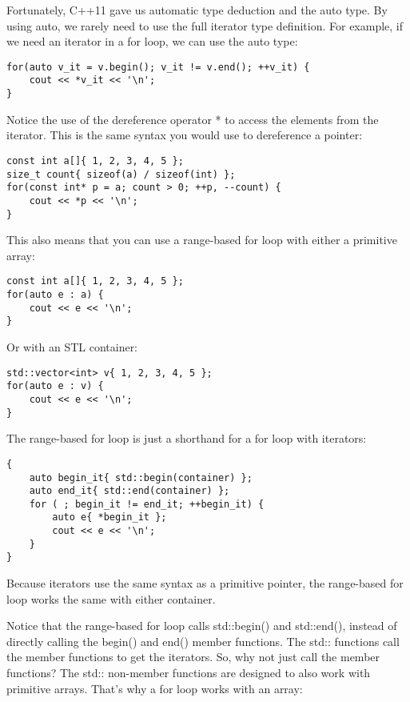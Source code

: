 Fortunately, C++11 gave us automatic type deduction and the auto type. By using auto, we rarely need to use the full iterator type definition. For example, if we need an iterator in a for loop, we can use the auto type:

\begin{lstlisting}[style=styleCXX]
for(auto v_it = v.begin(); v_it != v.end(); ++v_it) {
	cout << *v_it << '\n';
}
\end{lstlisting}

Notice the use of the dereference operator * to access the elements from the iterator. This is the same syntax you would use to dereference a pointer:

\begin{lstlisting}[style=styleCXX]
const int a[]{ 1, 2, 3, 4, 5 };
size_t count{ sizeof(a) / sizeof(int) };
for(const int* p = a; count > 0; ++p, --count) {
	cout << *p << '\n';
}
\end{lstlisting}

This also means that you can use a range-based for loop with either a primitive array:

\begin{lstlisting}[style=styleCXX]
const int a[]{ 1, 2, 3, 4, 5 };
for(auto e : a) {
	cout << e << '\n';
}
\end{lstlisting}

Or with an STL container:

\begin{lstlisting}[style=styleCXX]
std::vector<int> v{ 1, 2, 3, 4, 5 };
for(auto e : v) {
	cout << e << '\n';
}
\end{lstlisting}

The range-based for loop is just a shorthand for a for loop with iterators:

\begin{lstlisting}[style=styleCXX]
{
	auto begin_it{ std::begin(container) };
	auto end_it{ std::end(container) };
	for ( ; begin_it != end_it; ++begin_it) {
		auto e{ *begin_it };
		cout << e << '\n';
	}
}
\end{lstlisting}

Because iterators use the same syntax as a primitive pointer, the range-based for loop works the same with either container.

Notice that the range-based for loop calls std::begin() and std::end(), instead of directly calling the begin() and end() member functions. The std:: functions call the member functions to get the iterators. So, why not just call the member functions? The std:: non-member functions are designed to also work with primitive arrays. That's why a for loop works with an array:

